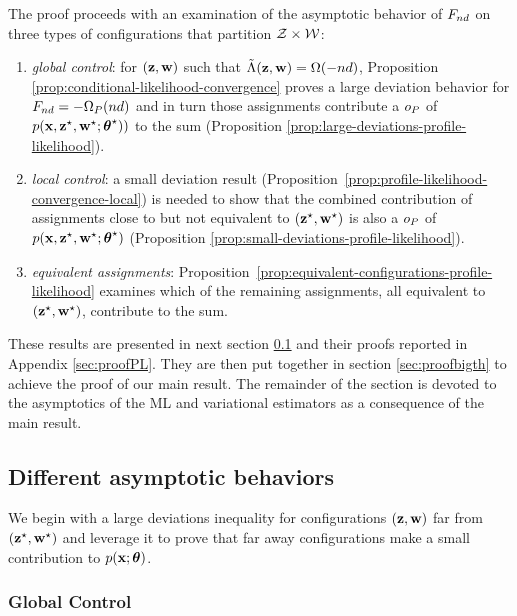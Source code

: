 \documentclass[]{imsart}
\newcommand{\1}{\mathds{1}}
\numberwithin{equation}{section}
\theoremstyle{plain}
\theoremstyle{remark}
\begin{document}
The proof proceeds with an examination of the asymptotic behavior of  $F_{nd}$ on three types of configurations that partition $\mathcal{Z}\times\mathcal{W}$:


\begin{enumerate}
\item  \emph{global control}: for $(\mathbf{z}, \mathbf{w})$ such that $\tilde{\Lambda}(\mathbf{z}, \mathbf{w}) = \Omega(-nd)$, Proposition \ref{prop:conditional-likelihood-convergence} proves a large deviation behavior for $F_{nd} = -\Omega_P(nd)$  and in turn those assignments contribute a $o_{P}$ of $p(\mathbf{x}, \mathbf{z}^\star, \mathbf{w}^\star; \boldsymbol{\theta}^\star))$ to the sum (Proposition \ref{prop:large-deviations-profile-likelihood}). 

\item \emph{local control}: a small deviation result (Proposition~\ref{prop:profile-likelihood-convergence-local}) is needed  to show that the combined contribution of assignments close to but not equivalent to $(\mathbf{z}^\star, \mathbf{w}^\star)$ is also a $o_{P}$ of $p(\mathbf{x}, \mathbf{z}^\star, \mathbf{w}^\star; \boldsymbol{\theta}^\star)$ (Proposition \ref{prop:small-deviations-profile-likelihood}). 
\item \emph{equivalent assignments}: Proposition~\ref{prop:equivalent-configurations-profile-likelihood} examines which of the remaining assignments, all equivalent to $(\mathbf{z}^\star, \mathbf{w}^\star)$, contribute to the sum.
\end{enumerate}
These results are presented in next section \ref{sec:technicalpropositions} and their proofs reported in Appendix \ref{sec:proofPL}. They are then put together in section \ref{sec:proofbigth} to achieve the proof of our main result. The remainder of the section is devoted to the asymptotics of the ML and variational estimators as a consequence of the main result.

\subsection{Different asymptotic behaviors}\label{sec:technicalpropositions}

We begin with a large deviations inequality for configurations $(\mathbf{z}, \mathbf{w})$ far from $(\mathbf{z}^\star, \mathbf{w}^\star)$ and leverage it to prove that far away configurations make a small contribution to $p(\mathbf{x}; \boldsymbol{\theta})$. 

\subsubsection{Global Control}
\end{document}
